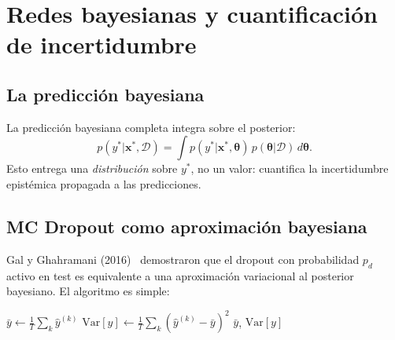\section{Redes bayesianas y cuantificación de incertidumbre}
\label{sec:bnn}


\subsection{La predicción bayesiana}
\label{subsec:pred_bayesiana}

La predicción bayesiana completa integra sobre el posterior:
\begin{equation}
  p(y^*|\bm{x}^*,\mathcal{D})
  = \int p(y^*|\bm{x}^*,\bm{\theta})\,
  p(\bm{\theta}|\mathcal{D})\,d\bm{\theta}.
  \label{eq:pred_bayesiana}
\end{equation}
Esto entrega una \emph{distribución} sobre $y^*$, no un valor: cuantifica
la incertidumbre epistémica propagada a las predicciones.

\subsection{MC Dropout como aproximación bayesiana}
\label{subsec:mc_dropout}

Gal y Ghahramani (2016)~\cite{gal2016dropout} demostraron que el dropout
con probabilidad $p_d$ activo en test es equivalente a una aproximación
variacional al posterior bayesiano. El algoritmo es simple:

\begin{algorithm}[H]
\caption{MC Dropout para cuantificación de incertidumbre}
\label{alg:mc_dropout}

$\bar{y} \leftarrow \frac{1}{T}\sum_k \hat{y}^{(k)}$\;
$\text{Var}[y] \leftarrow \frac{1}{T}\sum_k
(\hat{y}^{(k)}-\bar{y})^2$\;
\Return $\bar{y}$, $\text{Var}[y]$\;
\end{algorithm}

